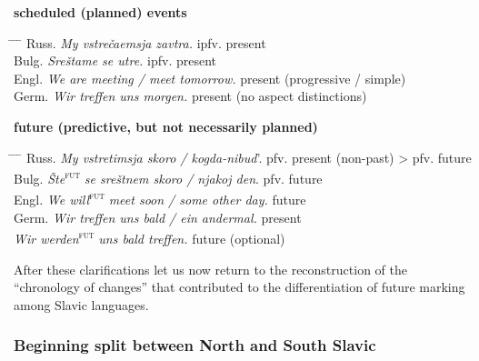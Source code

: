 \documentclass[output=paper,colorlinks,citecolor=brown]{langscibook}
\begin{document}
\ea \label{ex:wiemer:11} 
{\scriptsize\textbf{scheduled (planned) events}\\
\begin{tabbing}
    \hspace{1.5cm} \= \hspace{5cm} \= \hspace{4cm} \= \kill
    Russ. \> \textit{My vstrečaemsja zavtra.} \> ipfv. present \\
    Bulg. \> \textit{Sreštame se utre.} \> ipfv. present \\
    Engl. \> \textit{We are meeting / meet tomorrow.} \> present (progressive / simple) \\
    Germ. \> \textit{Wir treffen uns morgen.} \> present (no aspect distinctions) \\
\end{tabbing}
}
\z


\ea \label{ex:wiemer:12}
{\scriptsize \textbf{future (predictive, but not necessarily planned)}\\
\begin{tabbing}
    \hspace{1.5cm} \= \hspace{5cm} \= \hspace{6cm} \= \kill
    Russ. \> \textit{My vstretimsja skoro / kogda-nibud}’. \> pfv. present (non-past) > pfv. future \\
    Bulg. \> \textit{Šte}\textsc{\textsuperscript{fut}} \textit{se sreštnem skoro / njakoj den}. \> pfv. future \\
    Engl. \> \textit{We will}\textsc{\textsuperscript{fut}} \textit{meet soon / some other day.} \> future \\
    Germ. \> \textit{Wir treffen uns bald / ein andermal.} \> present \\
    \> \textit{Wir werden}\textsc{\textsuperscript{fut}} \textit{uns bald treffen.} \> future (optional) \\
\end{tabbing}
}
\z

After these clarifications let us now return to the reconstruction of the “chronology of changes” that contributed to the differentiation of future marking among Slavic languages.


\subsubsection{Beginning split between North and South Slavic}\label{sec:wiemer:3.1.4}
\end{document}
